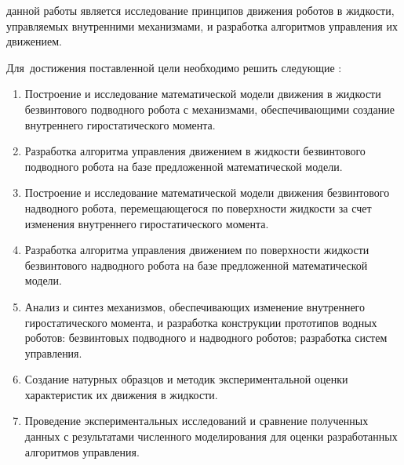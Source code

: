 {\aim} данной работы является исследование принципов движения роботов в жидкости, управляемых внутренними механизмами, и разработка алгоритмов управления их движением.

Для~достижения поставленной цели необходимо решить следующие {\tasks}:
\begin{enumerate}
  \item Построение и исследование математической модели движения в жидкости безвинтового подводного робота  с механизмами, обеспечивающими создание внутреннего гиростатического момента.
  \item Разработка алгоритма управления движением в жидкости безвинтового подводного робота на базе предложенной математической модели.
  \item Построение и исследование математической модели движения безвинтового надводного робота, перемещающегося по поверхности жидкости за счет изменения внутреннего гиростатического момента.
  \item Разработка алгоритма управления движением по поверхности жидкости безвинтового надводного робота на базе предложенной математической модели.
  \item Анализ и синтез механизмов, обеспечивающих изменение внутреннего гиростатического момента, и разработка конструкции прототипов водных роботов: безвинтовых подводного и надводного роботов; разработка систем управления.
  \item %
  Создание натурных образцов и методик экспериментальной оценки характеристик их движения в жидкости. %
  \item Проведение экспериментальных исследований и сравнение полученных данных с результатами численного моделирования для оценки разработанных алгоритмов управления.
\end{enumerate}


